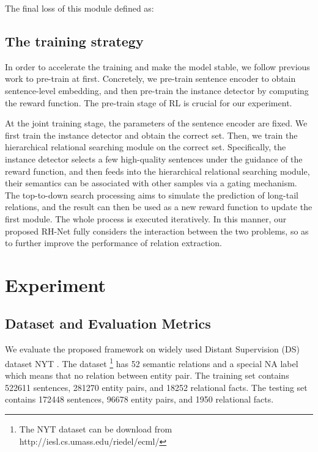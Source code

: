 \documentclass{article}
\begin{document}
The final loss of this module defined as:







\subsection{The training strategy}

In order to accelerate the training and make the model stable, we follow previous work \cite{Feng2018Reinforcement,Qin2018Robust} to pre-train at first. Concretely, we pre-train sentence encoder to obtain sentence-level embedding, and then pre-train the instance detector by computing the reward function. The pre-train stage of RL is crucial for our experiment. 

At the joint training stage, the parameters of the sentence encoder are fixed. We first train the instance detector and obtain the correct set. Then, we train the hierarchical relational searching module on the correct set. Specifically, the instance detector selects a few high-quality sentences under the guidance of the reward function, and then feeds into the hierarchical relational searching module, their semantics can be associated with other samples via a gating mechanism. The top-to-down search processing aims to simulate the prediction of long-tail relations, and the result can then be used as a new reward function to update the first module. The whole process is executed iteratively. In this manner, our proposed RH-Net fully considers the interaction between the two problems, so as to further improve the performance of relation extraction.

\section{Experiment}
\subsection{Dataset and Evaluation Metrics}

We evaluate the proposed framework on widely used Distant Supervision (DS) dataset NYT \cite{riedel2010modeling}. The dataset \footnote{The NYT dataset can be download from http://iesl.cs.umass.edu/riedel/ecml/} has 52 semantic relations and a special NA label which means that no relation between entity pair. The training set contains 522611 sentences, 281270 entity pairs, and 18252 relational facts. The testing set contains 172448 sentences, 96678 entity pairs, and 1950 relational facts.
\end{document}
